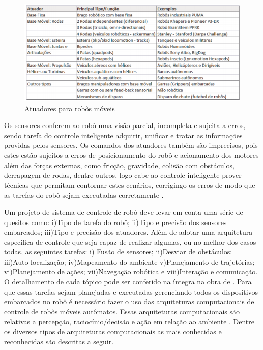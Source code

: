 \FloatBarrier
\begin{figure}[!h]
\centering
\includegraphics[keepaspectratio=true,scale=0.7]{figuras/atuadoresRobosMoveis.png}
\caption{Atuadores para robôs móveis \cite{wolf2009robotica}}
\label{modelagem}
\end{figure}

Os sensores conferem ao robô uma visão parcial, incompleta e sujeita a erros, sendo tarefa do controle inteligente adquirir, unificar e tratar as informações providas pelos sensores. Os comandos dos atuadores também são imprecisos, pois estes estão sujeitos a erros de posicionamento do robô e acionamento dos motores além das forças externas, como fricção, gravidade, colisão com obstáculos, derrapagem de rodas, dentre outros, logo cabe ao controle inteligente prover técnicas que permitam contornar estes cenários, corrigingo os erros de modo que as tarefas do robô sejam executadas corretamente \cite{wolf2009robotica}.

Um projeto de sistema de controle de robô deve levar em conta uma série de quesitos como: i)Tipo de tarefa do robô; ii)Tipo e precisão dos sensores embarcados; iii)Tipo e precisão dos atuadores. Além de adotar uma arquitetura específica de controle que seja capaz de realizar algumas, ou no melhor dos casos todas, as seguintes tarefas: i) Fusão de sensores; ii)Desviar de obstáculos; iii)Auto-localização; iv)Mapeamento do ambiente v)Planejamento de trajetórias; vi)Planejamento de ações; vii)Navegação robótica e viii)Interação e comunicação. O detalhamento de cada tópico pode ser conferido na íntegra na obra de \cite{wolf2009robotica}. 
Para que essas tarefas sejam planejadas e executadas gerenciando todos os dispositivos embarcados no robô é necessário fazer o uso das arquiteturas computacionais de controle de robôs móveis autômatos. Essas arquiteturas computacionais são relativas a percepção, raciocínio/decisão e ação em relação ao ambiente \cite{wolf2009robotica}. Dentre os diversos tipos de arquiteturas computacionais as mais conhecidas e reconhecidas são descritas a seguir.
